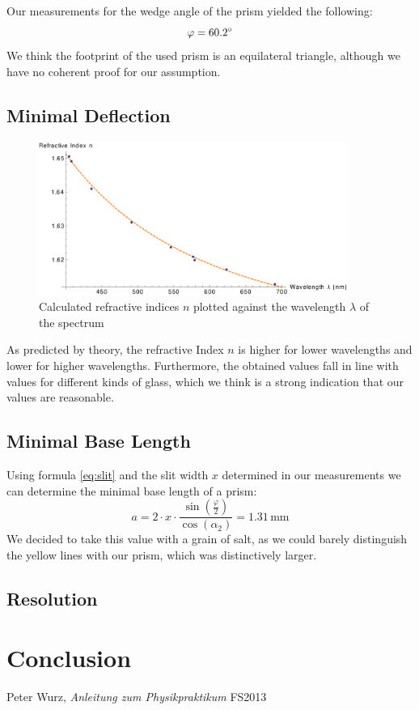 \documentclass{scrreprt}
\newcommand{\unit}[1]{\ensuremath{\, \mathrm{#1}}}
\renewcommand{\phi}{\varphi}
\begin{document}
Our measurements for the wedge angle of the prism yielded the following:
\begin{equation}
	\phi = \ang{60.2}
\notag
\end{equation}
We think the footprint of the used prism is an equilateral triangle, although we have no coherent proof for our assumption.

\subsection{Minimal Deflection}
\begin{figure}[H]
	\centering
  \includegraphics[width=0.9\textwidth]{diag/meas_and_fit.pdf}
	\caption{Calculated refractive indices $n$ plotted against the wavelength $\lambda$ of the spectrum}
	\label{fig:meas_and_fit}
\end{figure}
As predicted by theory, the refractive Index $n$ is higher for lower wavelengths and lower for higher wavelengths. Furthermore, the obtained values fall in line with values for different kinds of glass, which we think is a strong indication that our values are reasonable.

\subsection{Minimal Base Length}

Using formula \ref{eq:slit} and the slit width $x$ determined in our measurements we can determine the minimal base length of a prism:
\begin{equation}
	a = 2 \cdot x \cdot \frac{\sin(\frac{\phi}{2})}{\cos({\alpha_2})} = 1.31 \unit{mm}	
\end{equation}
We decided to take this value with a grain of salt, as we could barely distinguish the yellow lines with our prism, which was distinctively larger.

\subsection{Resolution}



\section{Conclusion}

\begin{thebibliography}{9}

  Peter Wurz,
  \emph{Anleitung zum Physikpraktikum}
  FS2013

\end{thebibliography}
\end{document}

